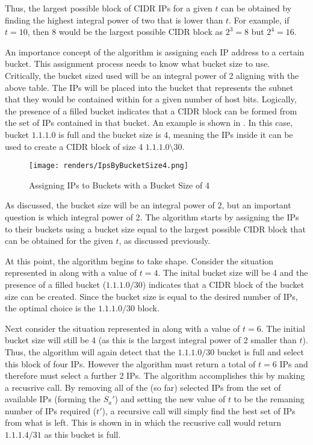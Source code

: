 Thus, the largest possible block of CIDR IPs for a given $t$ can be obtained by finding the highest integral power of two that is lower than $t$. For example, if $t = 10$, then 8 would be the largest possible CIDR block as $2^3 = 8$ but $2^4 = 16$.

An importance concept of the algorithm is assigning each IP address to a certain bucket. This assignment process needs to know what bucket size to use. Critically, the bucket sized used will be an integral power of 2 aligning with the above table. The IPs will be placed into the bucket that represents the subnet that they would be contained within for a given number of host bits. Logically, the presence of a filled bucket indicates that a CIDR block can be formed from the set of IPs contained in that bucket. An example is shown in . In this case, bucket $1.1.1.0$ is full and the bucket size is 4, meaning the IPs inside it can be used to create a CIDR block of size 4 $1.1.1.0\setminus30$.

\begin{figure}[H]
      \centering
      \texttt{[image: renders/IpsByBucketSize4.png]}
      \caption{Assigning IPs to Buckets with a Bucket Size of 4}
      \label{fig:exampleIpsByBucket4}
\end{figure}

As discussed, the bucket size will be an integral power of 2, but an important question is which integral power of 2. The algorithm starts by assigning the IPs to their buckets using a bucket size equal to the largest possible CIDR block that can be obtained for the given $t$, as discussed previously.

At this point, the algorithm begins to take shape. Consider the situation represented in  along with a value of $t = 4$. The inital bucket size will be 4 and the presence of a filled bucket ($1.1.1.0/30$) indicates that a CIDR block of the bucket size can be created. Since the bucket size is equal to the desired number of IPs, the optimal choice is the $1.1.1.0/30$ block.

Next consider the situation represented in  along with a value of $t = 6$. The initial bucket size will still be 4 (as this is the largest integral power of 2 smaller than $t$). Thus, the algorithm will again detect that the $1.1.1.0/30$ bucket is full and select this block of four IPs. However the algorithm must return a total of $t = 6$ IPs and therefore must select a further 2 IPs. The algorithm accomplishes this by making a recusrive call. By removing all of the (so far) selected IPs from the set of available IPs (forming the $S_a'$) and setting the new value of $t$ to be the remaning number of IPs required ($t'$), a recursive call will simply find the best set of IPs from what is left. This is shown in  in which the recusrive call would return $1.1.1.4/31$ as this bucket is full. 

